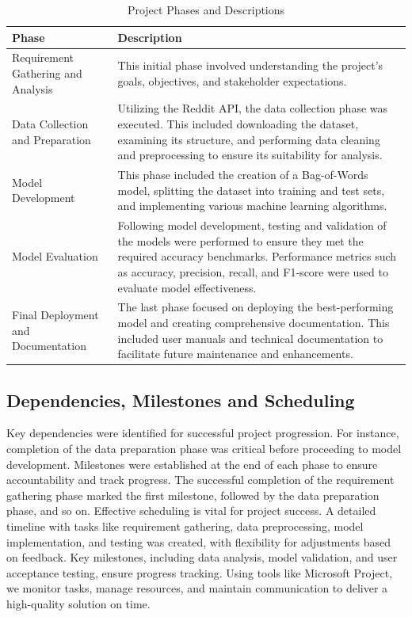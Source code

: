 \begin{table}[H]
    \centering
    \caption*{Project Phases and Descriptions}
    \label{tab:project_phases}
    \begin{tabularx}{\textwidth}{|p{4cm}|X|}
    \hline
    \rowcolor{lightestgray}
    \textbf{Phase} & \textbf{Description} \\ \hline
    Requirement Gathering and Analysis & This initial phase involved understanding the project's goals, objectives, and stakeholder expectations. \\ \hline
    Data Collection and Preparation & Utilizing the Reddit API, the data collection phase was executed. This included downloading the dataset, examining its structure, and performing data cleaning and preprocessing to ensure its suitability for analysis. \\ \hline
    Model Development & This phase included the creation of a Bag-of-Words model, splitting the dataset into training and test sets, and implementing various machine learning algorithms. \\ \hline
    Model Evaluation & Following model development, testing and validation of the models were performed to ensure they met the required accuracy benchmarks. Performance metrics such as accuracy, precision, recall, and F1-score were used to evaluate model effectiveness. \\ \hline
    Final Deployment and Documentation & The last phase focused on deploying the best-performing model and creating comprehensive documentation. This included user manuals and technical documentation to facilitate future maintenance and enhancements. \\ \hline
    \end{tabularx}
\end{table}

\subsection{Dependencies, Milestones and Scheduling} 
\noindent
Key dependencies were identified for successful project progression. For instance, completion of the data preparation phase was critical before proceeding to model development. Milestones were established at the end of each phase to ensure accountability and track progress. The successful completion of the requirement gathering phase marked the first milestone, followed by the data preparation phase, and so on. Effective scheduling is vital for project success. A detailed timeline with tasks like requirement gathering, data preprocessing, model implementation, and testing was created, with flexibility for adjustments based on feedback. Key milestones, including data analysis, model validation, and user acceptance testing, ensure progress tracking. Using tools like Microsoft Project, we monitor tasks, manage resources, and maintain communication to deliver a high-quality solution on time.



